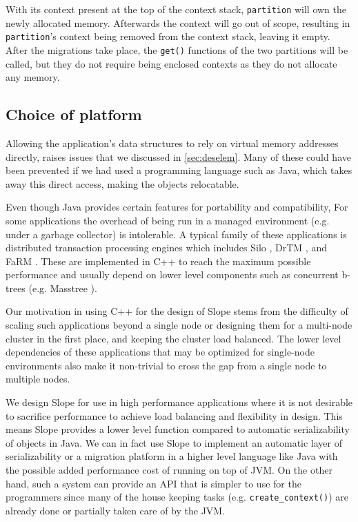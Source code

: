 With its context present at the top of
the context stack,
\texttt{partition} will own the newly allocated memory. Afterwards the context will
go out of scope, resulting in \texttt{partition}'s context being removed from the
context stack, leaving it empty. After the migrations take place, the \texttt{get()}
functions of the two partitions will be called, but they do not require
being enclosed contexts as they do not allocate any memory.

\subsection{Choice of platform}
Allowing the application's data structures to rely on virtual memory
addresses directly, raises issues that we discussed in \ref{sec:deselem}. Many
of these could have been prevented if we had used a programming language such
as Java, which takes away this direct access, making the objects relocatable.

Even though Java provides certain features for portability and compatibility,
For some applications the overhead of being run in a managed environment
(e.g. under a garbage collector) is intolerable. A typical family of these
applications is distributed transaction
processing engines which includes Silo \cite{tu2013silo}, DrTM \cite{drtm2017},
and FaRM \cite{Dragojevic2014FaRM}. These are implemented in C++ to
reach the maximum possible performance and usually depend on lower level
components such as concurrent b-trees (e.g. Masstree \cite{mao2020masstree}).

Our motivation in using C++ for the design of Slope stems from the difficulty
of scaling such applications beyond a single node or designing them for a
multi-node cluster in the first place, and keeping the cluster load balanced.
The lower level dependencies of
these applications that may be optimized for single-node environments also
make it non-trivial to cross the gap from a single node to multiple nodes.

We design Slope for use in high performance applications where it is not
desirable to sacrifice performance to achieve load balancing and flexibility
in design. This means Slope provides a lower level function compared to
automatic serializability of objects in Java.
We can in fact use Slope to implement
an automatic layer of serializability or a migration platform in a higher
level language like Java with the possible added performance cost of running on
top of JVM. On the other hand, such a system can provide an API that is simpler
to use for the programmers since many of the house keeping tasks (e.g.
\texttt{create\_context()}) are already done or partially taken care of by the JVM.



